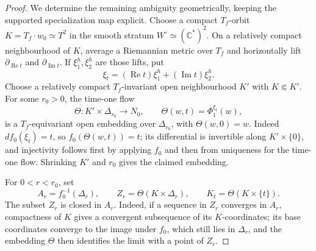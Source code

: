 \begin{proof}
We determine the remaining ambiguity geometrically, keeping the supported
specialization map explicit.  Choose a compact \(T_f\)-orbit
\(K=T_f\cdot w_0\simeq T^2\) in the smooth stratum
\(W^\circ\simeq(\mathbb C^*)^2\).  On a relatively compact neighbourhood
of \(K\), average a Riemannian metric over \(T_f\) and horizontally lift
\(\partial_{\operatorname{Re}t}\) and
\(\partial_{\operatorname{Im}t}\).  If \(\xi_1^h,\xi_2^h\) are those lifts,
put
\[
 \xi_t=(\operatorname{Re}t)\xi_1^h+
       (\operatorname{Im}t)\xi_2^h.
\]
Choose a relatively compact \(T_f\)-invariant open neighbourhood \(K'\)
with \(K\Subset K'\).  For some \(r_0>0\), the time-one flow
\[
 \Theta:K'\times\Delta_{r_0}\longrightarrow N_0,
 \qquad \Theta(w,t)=\Phi^{\xi_t}_1(w),
\tag{5.9a}
\]
is a \(T_f\)-equivariant open embedding over \(\Delta_{r_0}\), with
\(\Theta(w,0)=w\).  Indeed \(df_0(\xi_t)=t\), so
\(f_0(\Theta(w,t))=t\); its differential is invertible along
\(K'\times\{0\}\), and injectivity follows first by applying \(f_0\) and
then from uniqueness for the time-one flow.  Shrinking \(K'\) and \(r_0\)
gives the claimed embedding.

For \(0<r<r_0\), set
\[
 A_r=f_0^{-1}(\Delta_r),\qquad
 Z_r=\Theta(K\times\Delta_r),\qquad
 K_t=\Theta(K\times\{t\}).
\]
The subset \(Z_r\) is closed in \(A_r\).  Indeed, if a sequence in \(Z_r\)
converges in \(A_r\), compactness of \(K\) gives a convergent subsequence of
its \(K\)-coordinates; its base coordinates converge to the image under
\(f_0\), which still lies in \(\Delta_r\), and the embedding \(\Theta\)
then identifies the limit with a point of \(Z_r\).


\end{proof}
